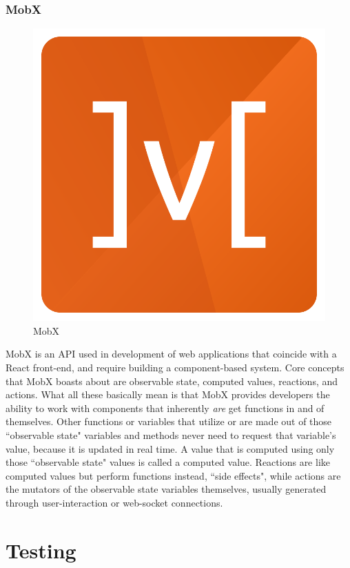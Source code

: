 \documentclass[12pt,a4paper]{report}
\begin{document}
			\subsubsection{MobX}
			\begin{figure}
				\includegraphics[scale=.17]{mobx}
				\caption{MobX}
				\label{fig: MobX}
			\end{figure}
			MobX is an API used in development of web applications that coincide with a React front-end, and require building a component-based system. Core concepts that MobX boasts about are observable state, computed values, reactions, and actions. What all these basically mean is that MobX provides developers the ability to work with components that inherently \textit{are} get functions in and of themselves. Other functions or variables that utilize or are made out of those ``observable state" variables and methods never need to request that variable's value, because it is updated in real time. A value that is computed using only those ``observable state" values is called a computed value. Reactions are like computed values but perform functions instead, ``side effects", while actions are the mutators of the observable state variables themselves, usually generated through user-interaction or web-socket connections. \cite{mobx}
	\section{Testing}
\end{document}
